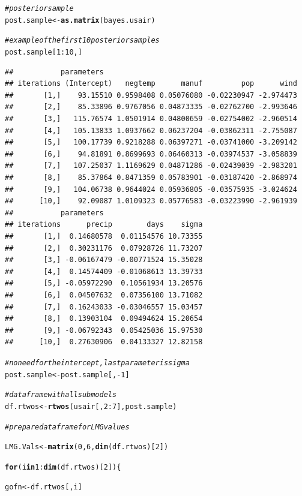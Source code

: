 \documentclass[11pt,a4paper,twoside]{book}\usepackage[]{graphicx}\usepackage[]{color}
\makeatletter
\newcommand{\hlnum}[1]{\textcolor[rgb]{0.686,0.059,0.569}{#1}}%
\newcommand{\hlcom}[1]{\textcolor[rgb]{0.678,0.584,0.686}{\textit{#1}}}%
\newcommand{\hlopt}[1]{\textcolor[rgb]{0,0,0}{#1}}%
\newcommand{\hlstd}[1]{\textcolor[rgb]{0.345,0.345,0.345}{#1}}%
\newcommand{\hlkwa}[1]{\textcolor[rgb]{0.161,0.373,0.58}{\textbf{#1}}}%
\newcommand{\hlkwb}[1]{\textcolor[rgb]{0.69,0.353,0.396}{#1}}%
\newcommand{\hlkwd}[1]{\textcolor[rgb]{0.737,0.353,0.396}{\textbf{#1}}}%
\newenvironment{kframe}{%
 \def\at@end@of@kframe{}%
 \ifinner\ifhmode%
  \def\at@end@of@kframe{\end{minipage}}%
  \begin{minipage}{\columnwidth}%
 \fi\fi%
 \def\FrameCommand##1{\hskip\@totalleftmargin \hskip-\fboxsep
 \colorbox{shadecolor}{##1}\hskip-\fboxsep
     \hskip-\linewidth \hskip-\@totalleftmargin \hskip\columnwidth}%
 \MakeFramed {\advance\hsize-\width
   \@totalleftmargin\z@ \linewidth\hsize
   \@setminipage}}%
 {\par\unskip\endMakeFramed%
 \at@end@of@kframe}
\newenvironment{knitrout}{}{} %
\makeatother
\begin{document}
\begin{knitrout}
\begin{kframe}
\begin{alltt}
\hlcom{#posterior sample}
\hlstd{post.sample} \hlkwb{<-} \hlkwd{as.matrix}\hlstd{(bayes.usair)}

\hlcom{#example of the first 10 posterior samples}
\hlstd{post.sample[}\hlnum{1}\hlopt{:}\hlnum{10}\hlstd{,]}
\end{alltt}
\begin{verbatim}
##           parameters
## iterations (Intercept)   negtemp      manuf         pop      wind
##       [1,]    93.15510 0.9598408 0.05076080 -0.02230947 -2.974473
##       [2,]    85.33896 0.9767056 0.04873335 -0.02762700 -2.993646
##       [3,]   115.76574 1.0501914 0.04800659 -0.02754002 -2.960514
##       [4,]   105.13833 1.0937662 0.06237204 -0.03862311 -2.755087
##       [5,]   100.17739 0.9218288 0.06397271 -0.03741000 -3.209142
##       [6,]    94.81891 0.8699693 0.06460313 -0.03974537 -3.058839
##       [7,]   107.25037 1.1169629 0.04871286 -0.02439039 -2.983201
##       [8,]    85.37864 0.8471359 0.05783901 -0.03187420 -2.868974
##       [9,]   104.06738 0.9644024 0.05936805 -0.03575935 -3.024624
##      [10,]    92.09087 1.0109323 0.05776583 -0.03223990 -2.961939
##           parameters
## iterations      precip        days    sigma
##       [1,]  0.14680578  0.01154576 10.73355
##       [2,]  0.30231176  0.07928726 11.73207
##       [3,] -0.06167479 -0.00771524 15.35028
##       [4,]  0.14574409 -0.01068613 13.39733
##       [5,] -0.05972290  0.10561934 13.20576
##       [6,]  0.04507632  0.07356100 13.71082
##       [7,]  0.16243033 -0.03046557 15.03457
##       [8,]  0.13903104  0.09494624 15.20654
##       [9,] -0.06792343  0.05425036 15.97530
##      [10,]  0.27630906  0.04133327 12.82158
\end{verbatim}
\begin{alltt}
\hlcom{#no need for the intercept, last parameter is sigma}
\hlstd{post.sample} \hlkwb{<-} \hlstd{post.sample[,}\hlopt{-}\hlnum{1}\hlstd{]}

\hlcom{#data frame with all submodels}
\hlstd{df.rtwos} \hlkwb{<-}\hlkwd{rtwos}\hlstd{(usair[,}\hlnum{2}\hlopt{:}\hlnum{7}\hlstd{], post.sample)}


\hlcom{# prepare data frame for LMG values}

\hlstd{LMG.Vals}\hlkwb{<-}\hlkwd{matrix}\hlstd{(}\hlnum{0}\hlstd{,} \hlnum{6}\hlstd{,} \hlkwd{dim}\hlstd{(df.rtwos)[}\hlnum{2}\hlstd{])}

\hlkwa{for}\hlstd{(i} \hlkwa{in} \hlnum{1}\hlopt{:}\hlkwd{dim}\hlstd{(df.rtwos)[}\hlnum{2}\hlstd{])\{}

  \hlstd{gofn}\hlkwb{<-}\hlstd{df.rtwos[,i]}


\end{alltt}
\end{kframe}
\end{knitrout}
\end{document}
